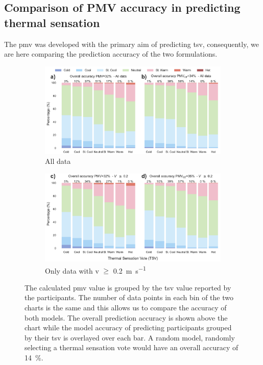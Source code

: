 \subsection{Comparison of PMV accuracy in predicting thermal sensation}\label{subsec:model-accuracy-comparison-in-predicting-thermal-sensation}
The \ac{pmv} was developed with the primary aim of predicting \ac{tsv}, consequently, we are here comparing the prediction accuracy of the two formulations.
\begin{figure}[htb!]
    \centering
    \begin{subfigure}[b]{\textwidth}
        \centering
        \includegraphics[width=\textwidth]{figures/bar_stacked_model_accuracy_0}
        \caption{All data}
     \end{subfigure}
    \begin{subfigure}[b]{\textwidth}
        \centering
        \includegraphics[width=\textwidth]{figures/bar_stacked_model_accuracy_0.2}
        \caption{Only data with \ac{v} $\geq$ \qty{0.2}{\m\per\s}}
     \end{subfigure}
    \caption{The calculated \ac{pmv} value is grouped by the \ac{tsv} value reported by the participants. 
    The number of data points in each bin of the two charts is the same and this allows us to compare the accuracy of both models.
    The overall prediction accuracy is shown above the chart while the model accuracy of predicting participants grouped by their \ac{tsv} is overlayed over each bar. 
    A random model, randomly selecting a thermal sensation vote would have an overall accuracy of \qty{14}{\percent}.}
    \label{fig:bar_stacked_model_accuracy}
\end{figure}
